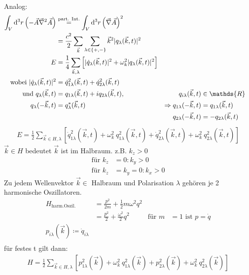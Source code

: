 	Analog:
		\begin{align*}
			\int_V \diff^3 r \left(- \vec{A} \vec{\nabla}^2 \vec{A}\right)
			&\overset{\text{part. Int.}}{=} \int_V \diff^3 r \left( \vec{\nabla} \vec{A} \right)^2 \\
			&= \frac{c^2}{2} \sum_{\vec{k}} \sum_{\lambda \in \{+ , - \} }
			\vec{k}^2 |q_\lambda (\vec{k} , t)|^2 \\
			E &= \frac{1}{4} \sum_{\vec{k} , \lambda} \left[
				|\dot{q}_\lambda (\vec{k} , t)|^2 + \omega^2_k |q_\lambda (\vec{k} , t)|^2
			\right] \\
			\text{wobei~} |\dot{q}_\lambda (\vec{k} , t)|^2 &= 
			\dot{q}_{1 \lambda}^2 (\vec{k} , t) + \dot{q}_{2 \lambda}^2 (\vec{k} , t) 
			\\
			\text{und~} 
			q_\lambda (\vec{k} , t) &= q_{1 \lambda} (\vec{k} , t) + i q_{2 \lambda} (\vec{k} , t) 
			,& q_{i \lambda} (\vec{k} , t) &\in \mathds{R} 
			\\
			q_\lambda (-\vec{k} , t) &= q_\lambda^* (\vec{k} , t) 
			&\Rightarrow q_{1 \lambda} (-\vec{k} , t) &= q_{1 \lambda} (\vec{k} , t) 
			\\
			& & q_{2 \lambda} (-\vec{k} , t) &= - q_{2 \lambda} (\vec{k} , t)			
		\end{align*}
		\begin{align*}
			E = \frac{1}{2} \sum_{\vec{k} \in H, \lambda}
			\left[
				\dot{q}_{1 \lambda}^2 (\vec{k} , t)
				+ \omega_k^2 ~q_{1 \lambda}^2 (\vec{k} , t)
				+ \dot{q}_{2 \lambda}^2 (\vec{k} , t)
				+ \omega_k^2 ~q_{2 \lambda}^2 (\vec{k} , t)
			\right]
		\end{align*}
	$\vec{k} \in H$ bedeutet $\vec{k}$ ist im Halbraum. z.B. $k_z > 0$
		\begin{align*}
			\text{für~} k_z &= 0 : k_y > 0 \\
			\text{für~} k_z &= k_y = 0 : k_x > 0 
		\end{align*}
	Zu jedem Wellenvektor $\vec{k} \in$ Halbraum und Polarisation $\lambda$ gehören je 2 harmonische Oszillatoren.	
		\begin{align*}
			H_{\text{harm.Oszil.}} &= 
			\frac{p^2}{2 m} + \frac{1}{2} m \omega^2 q^2 \\
			&= \frac{p^2}{2} + \frac{\omega^2}{2} q^2 
			&\text{für~} m &= 1 \text{~ist~} p = \dot{q} \\
			p_{i \lambda} (\vec{k}) \coloneqq \dot{q}_{i \lambda} \\
 		\end{align*}
 	für festes t gilt dann: 
	 	\begin{align*}
	 		H = \frac{1}{2} \sum_{\vec{k} \in H, \lambda}
	 		\left[
		 		p_{1 \lambda}^2 (\vec{k})
		 		+ \omega_k^2 ~q_{1 \lambda}^2 (\vec{k})
		 		+ p_{2 \lambda}^2 (\vec{k})
		 		+ \omega_k^2 ~q_{2 \lambda}^2 (\vec{k})
	 		\right]
	 	\end{align*}
